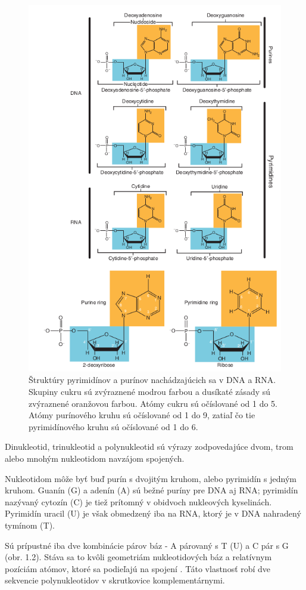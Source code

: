 \begin{figure}[!ht]
	\centering
	\includegraphics[width=.85\textwidth]{figures/bases}
	\caption{Štruktúry pyrimidínov a purínov nachádzajúcich sa v DNA a RNA. Skupiny cukru sú zvýraznené modrou farbou a dusíkaté zásady sú zvýraznené oranžovou farbou.
	Atómy cukru sú očíslované od 1 do 5. Atómy purínového kruhu sú očíslované od 1 do 9,
	zatiaľ čo tie pyrimidínového kruhu sú očíslované od 1 do 6. \label{o:nucleotide}}
\end{figure}

Dinukleotid, trinukleotid a polynukleotid sú výrazy zodpovedajúce dvom, trom alebo mnohým nukleotidom navzájom spojených.

Nukleotidom môže byť buď purín s dvojitým kruhom, alebo pyrimidín s jedným kruhom.
Guanín (G) a adenín (A) sú bežné puríny pre DNA aj RNA; pyrimidín nazývaný cytozín (C) je tiež prítomný v obidvoch nukleových kyselinách.
Pyrimidín uracil (U) je však obmedzený iba na RNA, ktorý je v DNA nahradený tymínom (T).

Sú prípustné iba dve kombinácie párov báz - A párovaný s T (U) a C pár s G (obr. 1.2).
Stáva sa to kvôli geometriám nukleotidových báz a relatívnym pozíciám atómov, ktoré sa podieľajú na spojení \cite{MolecularGenetics}.
Táto vlastnosť robí dve sekvencie polynukleotidov v skrutkovice komplementárnymi. 

